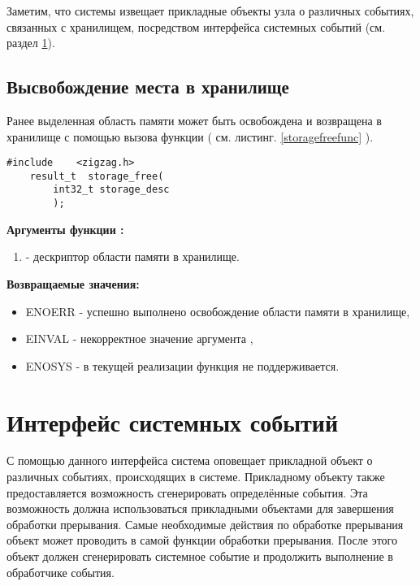 Заметим, что системы \zigzag извещает прикладные объекты узла о различных событиях, связанных с 
хранилищем, посредством интерфейса системных событий (см. раздел \ref{SysEventSect}).

\subsection{ Высвобождение места в хранилище }

Ранее выделенная область памяти может быть освобождена и возвращена в хранилище с помощью
вызова функции  ( см. листинг. \ref{storagefreefunc} ).

\begin{lstlisting}[caption=Функция \myfunc{storage\_free()} - возврат памяти в хранилище, label=storagefreefunc ]
    #include    <zigzag.h>
    result_t  storage_free(
        int32_t storage_desc
        );
\end{lstlisting}

{\bfseries Аргументы функции :}

{\itshape
\begin{enumerate} 
\item {} - дескриптор области памяти в хранилище.
\end{enumerate}
}

{\bfseries Возвращаемые значения:}

{\itshape
\begin{itemize}
\item ENOERR - успешно выполнено освобождение области памяти в хранилище,
\item EINVAL - некорректное значение аргумента ,
\item ENOSYS - в текущей реализации функция не поддерживается.
\end{itemize}
}

\section{Интерфейс системных событий}
\label{SysEventSect}

С помощью данного интерфейса система \zigzag оповещает прикладной объект о различных событиях, происходящих в системе.
Прикладному объекту также предоставляется возможность сгенерировать определённые события. Эта возможность должна использоваться
прикладными объектами для завершения обработки прерывания. Самые необходимые действия по обработке прерывания объект может
проводить в самой функции обработки прерывания. После этого объект должен сгенерировать системное событие и продолжить выполнение
в обработчике события.

